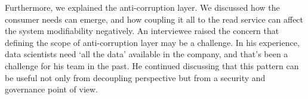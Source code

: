 \documentclass[a4paper,11pt,article,oneside]{memoir}
\begin{document}



Furthermore, we explained the anti-corruption layer. We discussed how the consumer needs can emerge, and how coupling it all to the read service can affect the system modifiability negatively. An interviewee raised the concern that defining the scope of anti-corruption layer may be a challenge. In his experience, data scientists need `all the data' available in the company, and that's been a challenge for his team in the past. He continued discussing that this pattern can be useful not only from decoupling perspective but from a security and governance point of view.



\end{document}
